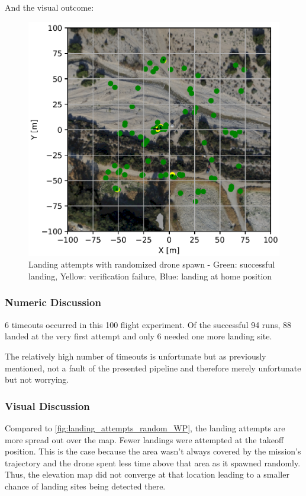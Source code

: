     And the visual outcome:

    \begin{figure}[h]
        \begin{center}
            \includegraphics[scale=0.25]{images/evaluation/landings_complete_randomized_GT.png}
            \caption{Landing attempts with randomized drone spawn - Green: successful landing, Yellow: verification failure, Blue: landing at home position}
            \label{fig:landing_attempts_complete_rand}
        \end{center}
    \end{figure}

    \subsubsection{Numeric Discussion}
    6 timeouts occurred in this 100 flight experiment. Of the successful 94 runs, 88 landed at the very first attempt and only 6 needed one more landing site.

    The relatively high number of timeouts is unfortunate but as previously mentioned, not a fault of the presented pipeline and therefore merely unfortunate but not worrying.


    \subsubsection{Visual Discussion}
    Compared to \cref{fig:landing_attempts_random_WP}, the landing attempts are more spread out over the map. Fewer landings were attempted at the takeoff position. This is the case because the area wasn't always covered by the mission's trajectory and the drone spent less time above that area as it spawned randomly. Thus, the elevation map did not converge at that location leading to a smaller chance of landing sites being detected there. 
    
